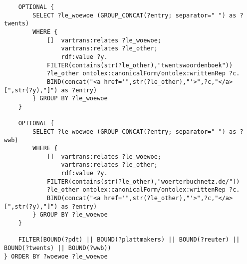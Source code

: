 \begin{verbatim}
	OPTIONAL { 
		SELECT ?le_woewoe (GROUP_CONCAT(?entry; separator=" ") as ?twents)
		WHERE {
			[] 	vartrans:relates ?le_woewoe;
				vartrans:relates ?le_other;
				rdf:value ?y.
			FILTER(contains(str(?le_other),"twentswoordenboek"))
			?le_other ontolex:canonicalForm/ontolex:writtenRep ?c.
            BIND(concat("<a href='",str(?le_other),"'>",?c,"</a> [",str(?y),"]") as ?entry)
		} GROUP BY ?le_woewoe 
	}

	OPTIONAL { 
		SELECT ?le_woewoe (GROUP_CONCAT(?entry; separator=" ") as ?wwb)
		WHERE {
			[] 	vartrans:relates ?le_woewoe;
				vartrans:relates ?le_other;
				rdf:value ?y.
			FILTER(contains(str(?le_other),"woerterbuchnetz.de/"))
			?le_other ontolex:canonicalForm/ontolex:writtenRep ?c.
            BIND(concat("<a href='",str(?le_other),"'>",?c,"</a> [",str(?y),"]") as ?entry)
		} GROUP BY ?le_woewoe 
	}

	FILTER(BOUND(?pdt) || BOUND(?plattmakers) || BOUND(?reuter) || BOUND(?twents) || BOUND(?wwb))
} ORDER BY ?woewoe ?le_woewoe
\end{verbatim}